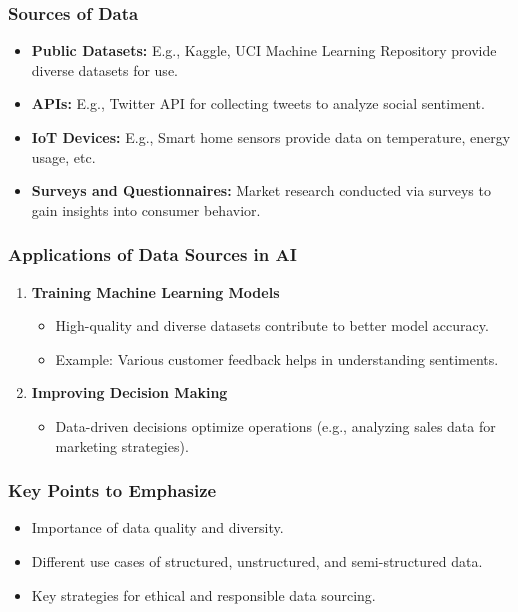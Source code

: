 \documentclass[aspectratio=169]{beamer}
\begin{document}
\begin{frame}[fragile]
    \frametitle{Sources of Data}
    \begin{itemize}
        \item \textbf{Public Datasets:} E.g., Kaggle, UCI Machine Learning Repository provide diverse datasets for use.
        \item \textbf{APIs:} E.g., Twitter API for collecting tweets to analyze social sentiment.
        \item \textbf{IoT Devices:} E.g., Smart home sensors provide data on temperature, energy usage, etc.
        \item \textbf{Surveys and Questionnaires:} Market research conducted via surveys to gain insights into consumer behavior.
    \end{itemize}
\end{frame}

\begin{frame}[fragile]
    \frametitle{Applications of Data Sources in AI}
    \begin{enumerate}
        \item \textbf{Training Machine Learning Models}
            \begin{itemize}
                \item High-quality and diverse datasets contribute to better model accuracy.
                \item Example: Various customer feedback helps in understanding sentiments.
            \end{itemize}
        \item \textbf{Improving Decision Making}
            \begin{itemize}
                \item Data-driven decisions optimize operations (e.g., analyzing sales data for marketing strategies).
            \end{itemize}
    \end{enumerate}
\end{frame}

\begin{frame}[fragile]
    \frametitle{Key Points to Emphasize}
    \begin{itemize}
        \item Importance of data quality and diversity.
        \item Different use cases of structured, unstructured, and semi-structured data.
        \item Key strategies for ethical and responsible data sourcing.
    \end{itemize}
\end{frame}
\end{document}
